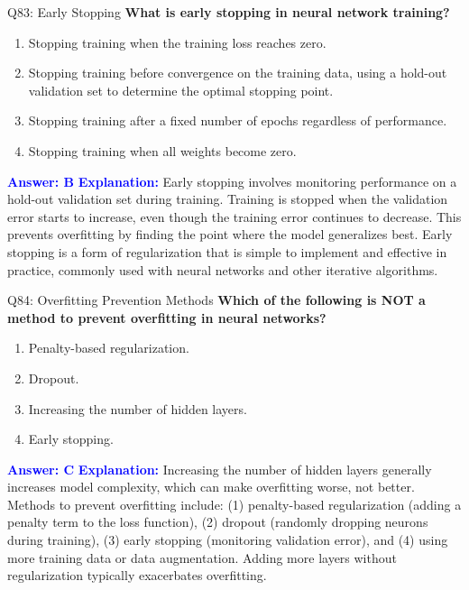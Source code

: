 \documentclass[8pt]{beamer}
\begin{document}
	\begin{frame}{Q83: Early Stopping}
		\fontsize{6.5}{7.5}\selectfont
		\textbf{What is early stopping in neural network training?}
		\begin{enumerate}
			\item Stopping training when the training loss reaches zero.
			\item Stopping training before convergence on the training data, using a hold-out validation set to determine the optimal stopping point.
			\item Stopping training after a fixed number of epochs regardless of performance.
			\item Stopping training when all weights become zero.
		\end{enumerate}
		\vspace{0.1cm}
		\textcolor{blue}{\textbf{Answer: B}}
		\vspace{0.1cm}
		\textcolor{blue}{\textbf{Explanation:}} Early stopping involves monitoring performance on a hold-out validation set during training. Training is stopped when the validation error starts to increase, even though the training error continues to decrease. This prevents overfitting by finding the point where the model generalizes best. Early stopping is a form of regularization that is simple to implement and effective in practice, commonly used with neural networks and other iterative algorithms.
	\end{frame}
	
	\begin{frame}{Q84: Overfitting Prevention Methods}
		\fontsize{6.5}{7.5}\selectfont
		\textbf{Which of the following is NOT a method to prevent overfitting in neural networks?}
		\begin{enumerate}
			\item Penalty-based regularization.
			\item Dropout.
			\item Increasing the number of hidden layers.
			\item Early stopping.
		\end{enumerate}
		\vspace{0.1cm}
		\textcolor{blue}{\textbf{Answer: C}}
		\vspace{0.1cm}
		\textcolor{blue}{\textbf{Explanation:}} Increasing the number of hidden layers generally increases model complexity, which can make overfitting worse, not better. Methods to prevent overfitting include: (1) penalty-based regularization (adding a penalty term to the loss function), (2) dropout (randomly dropping neurons during training), (3) early stopping (monitoring validation error), and (4) using more training data or data augmentation. Adding more layers without regularization typically exacerbates overfitting.
	\end{frame}
	
\end{document}
